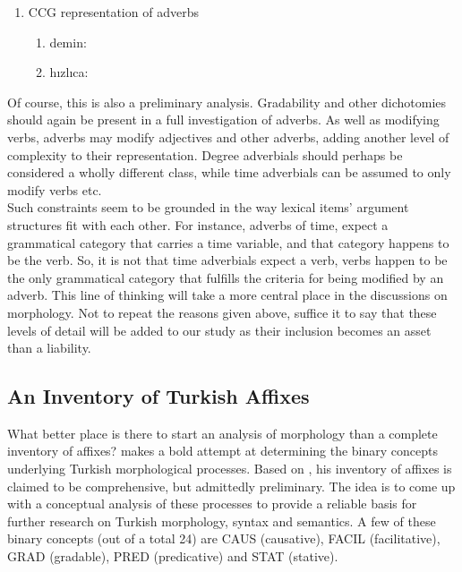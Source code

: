 \documentclass[11pt]{article} %
\begin{document}
\begin{enumerate}[resume*]
	\item CCG representation of adverbs \label{CCGAdv}
	\begin{enumerate}[label=(\alph*), ref=(\alph*)]\itemsep1pt
	\item demin:  \label{a}
	\item hızlıca:  \label{b}
	\end{enumerate}
\end{enumerate}

Of course, this is also a preliminary analysis. Gradability and other dichotomies should again be present in a full investigation of adverbs. As well as modifying verbs, adverbs may modify adjectives and other adverbs, adding another level of complexity to their representation. Degree adverbials should perhaps be considered a wholly different class, while time adverbials can be assumed to only modify verbs etc. \\ 

Such constraints seem to be grounded in the way lexical items' argument structures fit with each other. For instance, adverbs of time, expect a grammatical category that carries a time variable, and that category happens to be the verb. So, it is not that time adverbials expect a verb, verbs happen to be the only grammatical category that fulfills the criteria for being modified by an adverb. This line of thinking will take a more central place in the discussions on morphology. Not to repeat the reasons given above, suffice it to say that these levels of detail will be added to our study as their inclusion becomes an asset than a liability.\\

\subsection{An Inventory of Turkish Affixes}

\label{InvTRAff}

What better place is there to start an analysis of morphology than a complete inventory of affixes? \citet{Bozsahin2018} makes a bold attempt at determining the binary concepts underlying Turkish morphological processes. Based on \citet{OflazerGocmenBozsahin1995}, his inventory of affixes is claimed to be comprehensive, but admittedly preliminary. The idea is to come up with a conceptual analysis of these processes to provide a reliable basis for further research on Turkish morphology, syntax and semantics. A few of these binary concepts (out of a total 24) are CAUS (causative), FACIL (facilitative), GRAD (gradable), PRED (predicative) and STAT (stative). \\
\end{document}
